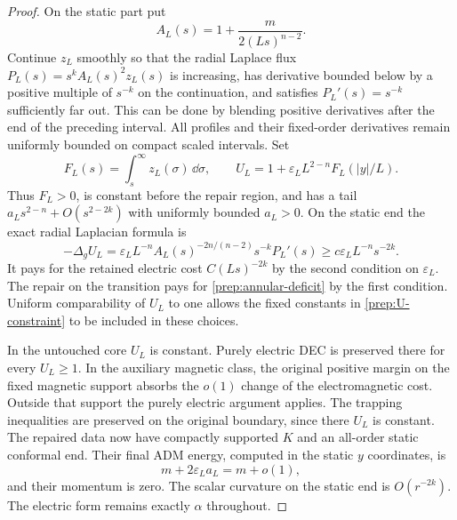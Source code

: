 \begin{proof}
On the static part put
\[
 A_L(s)=1+\frac{m}{2(Ls)^{n-2}}.
\]
Continue $z_L$ smoothly so that the radial Laplace flux
$P_L(s)=s^kA_L(s)^2z_L(s)$ is increasing, has derivative bounded below
by a positive multiple of $s^{-k}$ on the continuation, and satisfies
$P_L'(s)=s^{-k}$ sufficiently far out.  This can be done by blending
positive derivatives after the end of the preceding interval.  All
profiles and their fixed-order derivatives remain uniformly bounded
on compact scaled intervals.  Set
\[
 F_L(s)=\int_s^\infty z_L(\sigma)\,\dd\sigma,
 \qquad U_L=1+\varepsilon_LL^{2-n}F_L(|y|/L).
\]
Thus $F_L>0$, is constant before the repair region, and has a tail
$a_Ls^{2-n}+O(s^{2-2k})$ with uniformly bounded $a_L>0$.
On the static end the exact radial Laplacian formula is
\[
 -\Delta_g U_L
 =\varepsilon_LL^{-n}A_L(s)^{-2n/(n-2)}s^{-k}P_L'(s)
 \geq c\varepsilon_LL^{-n}s^{-2k}.
\]
It pays for the retained electric cost $C(Ls)^{-2k}$ by the second
condition on $\varepsilon_L$.  The repair on the transition pays for
\eqref{prep:annular-deficit} by the first condition.  Uniform
comparability of $U_L$ to one allows the fixed constants in
\eqref{prep:U-constraint} to be included in these choices.

In the untouched core $U_L$ is constant.  Purely electric DEC is
preserved there for every $U_L\geq1$.  In the auxiliary magnetic class,
the original positive margin on the fixed magnetic support absorbs
the $o(1)$ change of the electromagnetic cost.  Outside that support
the purely electric argument applies.  The trapping inequalities are
preserved on the original boundary, since there $U_L$ is constant.
The repaired data now have compactly supported $K$ and an all-order
static conformal end.  Their final ADM energy, computed in the static
$y$ coordinates, is
\[
 m+2\varepsilon_La_L=m+o(1),
\]
and their momentum is zero.  The scalar curvature on the static end is
$O(r^{-2k})$.  The electric form remains exactly $\alpha$ throughout.


\end{proof}
